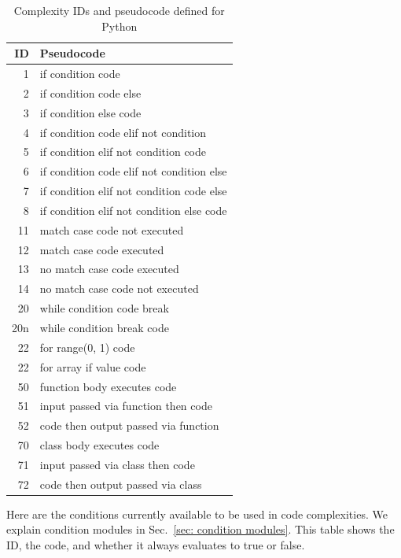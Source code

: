 \documentclass[12pt]{article}
\begin{document}
\begin{table}[H]
\centering
\caption{Complexity IDs and pseudocode defined for Python}
\begin{tabular}{|r|l|}
\hline
\textbf{ID} & \textbf{Pseudocode} \\
\hline
 1 & if condition code \\
\hline
 2 & if condition code else \\
\hline
 3 & if condition else code \\
\hline
 4 & if condition code elif not condition \\
\hline
 5 & if condition elif not condition code \\
\hline
 6 & if condition code elif not condition else \\
\hline
 7 & if condition elif not condition code else \\
 \hline
 8 & if condition elif not condition else code \\
\hline

 11 & match case code not executed \\
\hline
 12 & match case code executed \\
\hline
 13 & no match case code executed \\
\hline
 14 & no match case code not executed \\
\hline

20 & while condition code break \\
\hline
20n & while condition break code \\
\hline
22 & for range(0, 1) code \\
\hline
22 & for array if value code \\
\hline

50 & function body executes code \\
\hline
51 & input passed via function then code \\
\hline
52 & code then output passed via function \\
\hline

70 & class body executes code \\
\hline
71 & input passed via class then code \\
\hline
72 & code then output passed via class \\
\hline
\end{tabular}
\label{tab:complexity IDs for Python}
\end{table}

\newpage

Here are the conditions currently available to be used in code complexities.
We explain condition modules in Sec.~\ref{sec: condition modules}.
This table shows the ID, the code, and whether it
always evaluates to true or false.
\end{document}
